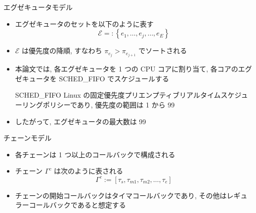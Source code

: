 \begin{frame}{エグゼキュータモデル}
    \begin{itemize}
        \item エグゼキュータのセットを以下のように表す
              \vspace{-2mm}
              \begin{equation*}
                  \mathcal{E}=:\left\{e_{1}, \ldots, e_{j}, \ldots, e_{E}\right\}
              \end{equation*}

        \item $\mathcal{E}$ は優先度の降順, すなわち $\pi_{e_{j}}>\pi_{e_{j+1}}$ でソートされる
        \item 本論文では, 各エグゼキュータを 1 つの CPU コアに割り当て, 各コアのエグゼキュータを SCHED\_FIFO でスケジュールする
              \begin{block}{SCHED\_FIFO}
                  Linux の固定優先度プリエンプティブリアルタイムスケジューリングポリシーであり, 優先度の範囲は 1 から 99
              \end{block}
              \vspace{5mm}
        \item したがって, エグゼキュータの最大数は 99
    \end{itemize}
\end{frame}

\begin{frame}{チェーンモデル}
    \begin{itemize}
        \item 各チェーンは 1 つ以上のコールバックで構成される
        \item チェーン $\Gamma^{c}$ は次のように表される
              \vspace{-2mm}
              \begin{equation*}
                  \Gamma^{c}:=\left[\tau_{s}, \tau_{m 1}, \tau_{m 2}, \ldots, \tau_{e}\right]
              \end{equation*}
        \item チェーンの開始コールバックはタイマコールバックであり, その他はレギュラーコールバックであると想定する
    \end{itemize}
\end{frame}

